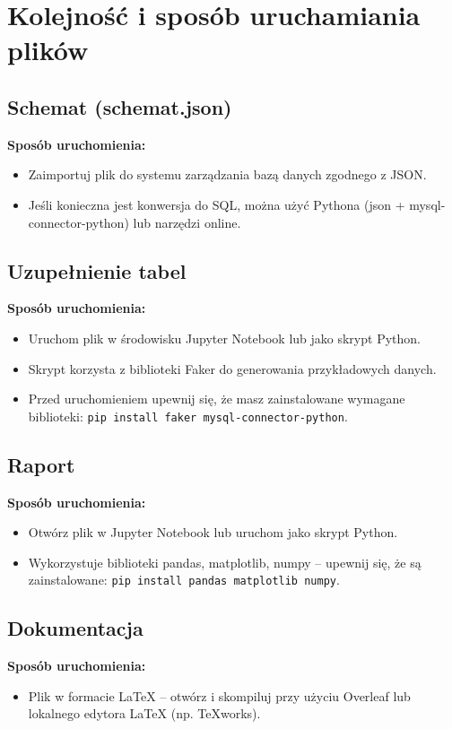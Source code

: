 \documentclass{article}
\theoremstyle{definition}
\begin{document}
	\section{Kolejność i sposób uruchamiania plików}
	
	\subsection{Schemat (schemat.json)}
	\textbf{Sposób uruchomienia:}
	\begin{itemize}
		\item Zaimportuj plik do systemu zarządzania bazą danych zgodnego z JSON.
		\item Jeśli konieczna jest konwersja do SQL, można użyć Pythona (json + mysql-connector-python) lub narzędzi online.
	\end{itemize}
	
	\subsection{Uzupełnienie tabel}
	\textbf{Sposób uruchomienia:}
	\begin{itemize}
		\item Uruchom plik w środowisku Jupyter Notebook lub jako skrypt Python.
		\item Skrypt korzysta z biblioteki Faker do generowania przykładowych danych.
		\item Przed uruchomieniem upewnij się, że masz zainstalowane wymagane biblioteki: \texttt{pip install faker mysql-connector-python}.
	\end{itemize}
	
	\subsection{Raport}
	\textbf{Sposób uruchomienia:}
	\begin{itemize}
		\item Otwórz plik w Jupyter Notebook lub uruchom jako skrypt Python.
		\item Wykorzystuje biblioteki pandas, matplotlib, numpy – upewnij się, że są zainstalowane: \texttt{pip install pandas matplotlib numpy}.
	\end{itemize}
	
	\subsection{Dokumentacja}
	\textbf{Sposób uruchomienia:}
	\begin{itemize}
		\item Plik w formacie LaTeX – otwórz i skompiluj przy użyciu Overleaf lub lokalnego edytora LaTeX (np. TeXworks).
	\end{itemize}
	
\end{document}
